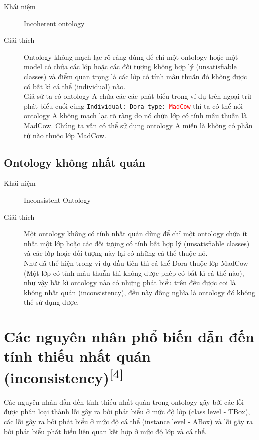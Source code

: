 \begin{description}

\item[Khái niệm] Incoherent ontology

\item[Giải thích]
Ontology không mạch lạc rõ ràng dùng để chỉ một ontology hoặc một model có chứa các lớp hoặc các đối tượng không hợp lý (unsatisfiable classes) và điểm quan trọng là các lớp có tính mâu thuẫn đó không được có bất kì cá thể (individual) nào.
\\
Giả sử ta có ontology A chứa các các phát biếu trong ví dụ trên ngoại trừ phát biểu cuối cùng \texttt{Individual: Dora type: \textcolor{red}{MadCow}} thì ta có thể nói ontology A không mạch lạc rõ ràng do nó chứa lớp có tính mâu thuẫn là MadCow. Chúng ta vẫn có thể sử dụng ontology A miễn là không có phần tử nào thuộc lớp MadCow.
\end{description}

\subsection{Ontology không nhất quán}
\begin{description}
\item[Khái niệm] Inconsistent Ontology
\item[Giải thích] 
Một ontology không có tính nhất quán dùng để chỉ một ontology chứa ít nhất một lớp hoặc các đối tượng có tính bất hợp lý (unsatisfiable classes) và các lớp hoặc đối tượng này lại có những cá thể thuộc nó.
\\
Như đã thể hiện trong ví dụ đầu tiên thì cá thể Dora thuộc lớp MadCow (Một lớp có tính mâu thuẫn thì không được phép có bất kì cá thể nào), như vậy bất kì ontology nào có những phát biểu trên đều được coi là không nhất quán (inconsistency), đều này đồng nghĩa là ontology đó không thể sử dụng được.
\end{description}

\section{Các nguyên nhân phổ biến dẫn đến tính thiếu nhất quán (inconsistency)\textsuperscript{[4]}}
	Các nguyên nhân dẫn đến tính thiếu nhất quán trong ontology gây bởi các lỗi được phân loại thành lỗi gây ra bởi phát biểu ở mức độ lớp (class level - TBox), các lỗi gây ra bởi phát biểu ở mức độ cá thể (instance level - ABox) và lỗi gây ra bởi phát biểu phát biểu liên quan  kết hợp ở mức độ lớp và cá thể.
